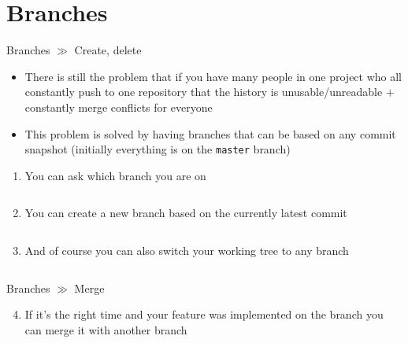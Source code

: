 \documentclass[10pt]{beamer}
\begin{document}
\section{Branches}

\begin{frame}{Branches $\gg$ Create, delete}
\begin{center}
\begin{itemize}
\item There is still the problem that if you have many people in one project who all constantly push to one repository that the history is unusable/unreadable $+$ constantly merge conflicts for everyone
\item This problem is solved by having branches that can be based on any commit snapshot (initially everything is on the \texttt{master} branch)
\end{itemize}
\begin{enumerate}
	\item You can ask which branch you are on \\
	\inputminted[bgcolor=lightGreyCustom,fontsize=\scriptsize]{sh}{./resources/git_branches_01_branch.sh}
	\item You can create a new branch based on the currently latest commit \\
	\inputminted[bgcolor=lightGreyCustom,fontsize=\scriptsize]{sh}{./resources/git_branches_02_create.sh}
	\item And of course you can also switch your working tree to any branch \\
	\inputminted[bgcolor=lightGreyCustom,fontsize=\scriptsize]{sh}{./resources/git_branches_03_checkout.sh}
\end{enumerate}
\end{center}
\end{frame}

\begin{frame}{Branches $\gg$ Merge}
\begin{center}
	\begin{enumerate}\setcounter{enumi}{3}
		\item If it's the right time and your feature was implemented on the branch you can merge it with another branch \\
		\inputminted[bgcolor=lightGreyCustom,fontsize=\scriptsize]{sh}{./resources/git_branches_04_merge.sh}
	\end{enumerate}
\end{center}
\end{frame}
\end{document}
